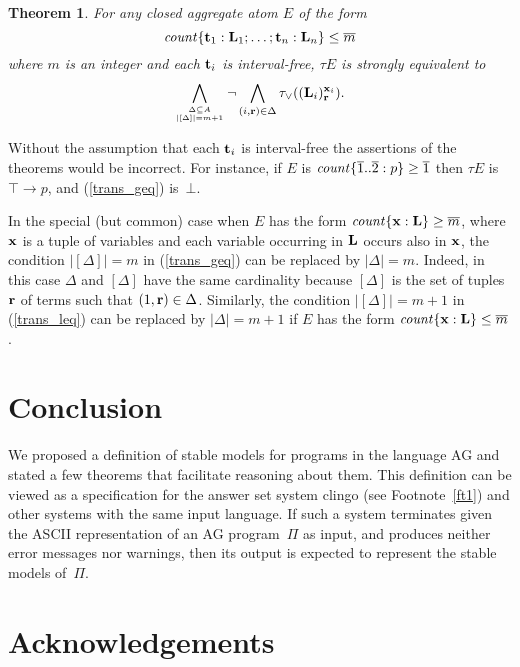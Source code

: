 \documentclass{tlp}
\def\rar{\rightarrow}
\def\beq{\begin{equation}}
\def\eeq#1{\label{#1}\end{equation}}
\newtheorem{theorem}{Theorem}
\begin{document}
\begin{theorem}\label{lem:leq}
For any closed aggregate atom $E$ of the form
$$
{\it count}\{{\bf t}_1 : {\bf L}_1; \dots ; {\bf t}_n : {\bf L}_n \} \leq \overline m
$$
where $m$ is an integer and each ${\bf t}_i$ is interval-free, $\tau E$ is
strongly equivalent to
\beq
  \bigwedge_{\Delta \subseteq A \atop \lvert [\Delta] \rvert = m+1}  \neg
  \bigwedge_{(i, {\bf r}) \in\Delta} \tau_{\lor}
  (({\bf L}_i)^{{\bf x}_i}_{\bf r}).
\eeq{trans_leq}
\end{theorem}

Without the assumption that each ${\bf t}_i$ is interval-free the assertions
of the theorems would be incorrect. For instance, if $E$ is
${\it count}\{\overline 1..\overline 2:p\} \geq \overline 1$ then $\tau E$ is $\top \rar p$, and
(\ref{trans_geq}) is~$\bot$.

In the special (but common) case when $E$ has the form
${\it count}\{{\bf x}: {\bf L}\} \geq \overline m$,
where ${\bf x}$ is a tuple of variables and each variable occurring in
${\bf L}$ occurs also in ${\bf x}$,
the condition $\lvert [\Delta] \rvert = m$ in (\ref{trans_geq})
can be replaced by $\lvert \Delta \rvert = m$. Indeed, in this case
$\Delta$ and $[\Delta]$ have the same cardinality because $[\Delta]$
is the set of tuples ${\bf r}$ of terms such that $(1, {\bf r}) \in \Delta$.
Similarly,  the condition $\lvert [\Delta] \rvert = m+1$ in (\ref{trans_leq})
can be replaced by $\lvert \Delta \rvert = m+1$ if
$E$ has the form ${\it count}\{{\bf x}: {\bf L}\} \leq \overline m$.

\section{Conclusion}

We proposed a definition of stable models for programs in the language AG and
stated a few theorems that facilitate reasoning about them.  This definition
can be viewed as a specification for the answer set
system {\sc clingo} (see Footnote~\ref{ft1}) and other systems with the
same input language.  If such a system terminates given the ASCII
representation of an AG program~$\Pi$ as input, and produces neither error
messages nor warnings, then its output is expected to represent the stable
models of~$\Pi$.

\section*{Acknowledgements}
\end{document}
